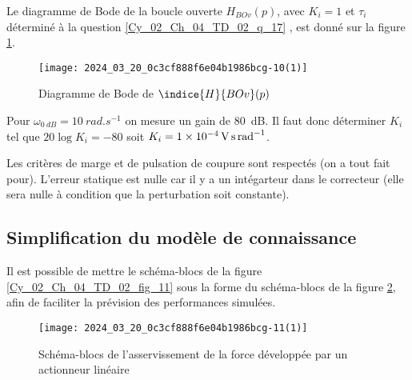 \ifprof
\else
Le diagramme de Bode de la boucle ouverte $H_{B O v}(p)$, avec $K_{i}=1$ et $\tau_{i}$ déterminé à la question \ref{Cy_02_Ch_04_TD_02_q_17} , est donné sur la figure \ref{Cy_02_Ch_04_TD_02_fig_13}.



\begin{figure}[!h]
\texttt{[image: 2024\_03\_20\_0c3cf888f6e04b1986bcg-10(1)]}
\caption{Diagramme de Bode de $\indice{H}{BOv}(p)$ \label{Cy_02_Ch_04_TD_02_fig_13}}
\end{figure}
\fi


\ifprof
\begin{corrige}
Pour $\omega_{\SI{0}{dB}}=\SI{10}{rad.s^{-1}}$ on mesure un gain de \SI{80}{dB}. 
Il faut donc déterminer $K_i$ tel que $20\log K_i = -80$ soit $K_i = \SI{1e{-4}}{V.s.rad^{-1}} $. 


Les critères de marge et de pulsation de coupure sont respectés (on a tout fait pour).
L'erreur statique est nulle car il y a un intégarteur dans le correcteur (elle sera nulle à condition que la perturbation soit constante).

\end{corrige}
\else
\fi

\subsection*{Simplification du modèle de connaissance}
\ifprof
\else
Il est possible de mettre le schéma-blocs de la figure \ref{Cy_02_Ch_04_TD_02_fig_11} 
sous la forme du schéma-blocs de la figure \ref{Cy_02_Ch_04_TD_02_fig_14}, afin de faciliter la prévision des performances simulées.

\begin{figure}[!h]
\texttt{[image: 2024\_03\_20\_0c3cf888f6e04b1986bcg-11(1)]}
\caption{Schéma-blocs de l'asservissement de la force développée par un actionneur linéaire \label{Cy_02_Ch_04_TD_02_fig_14}}
\end{figure}
\fi

